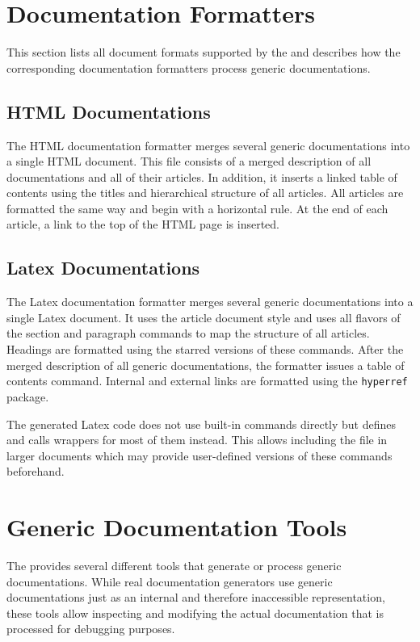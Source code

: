 \section{Documentation Formatters}

This section lists all document formats supported by the \ecs{} and describes how the corresponding documentation formatters process generic documentations.

\subsection{HTML Documentations}

The HTML documentation formatter merges several generic documentations into a single HTML document.
This file consists of a merged description of all documentations and all of their articles.
In addition, it inserts a linked table of contents using the titles and hierarchical structure of all articles.
All articles are formatted the same way and begin with a horizontal rule.
At the end of each article, a link to the top of the HTML page is inserted.

\subsection{Latex Documentations}

The Latex documentation formatter merges several generic documentations into a single Latex document.
It uses the article document style and uses all flavors of the section and paragraph commands to map the structure of all articles.
Headings are formatted using the starred versions of these commands.
After the merged description of all generic documentations, the formatter issues a table of contents command.
Internal and external links are formatted using the \texttt{hyperref} package.

The generated Latex code does not use built-in commands directly but defines and calls wrappers for most of them instead.
This allows including the file in larger documents which may provide user-defined versions of these commands beforehand.

\section{Generic Documentation Tools}

The \ecs{} provides several different tools that generate or process generic documentations.
While real documentation generators use generic documentations just as an internal and therefore inaccessible representation,
these tools allow inspecting and modifying the actual documentation that is processed for debugging purposes.
\interface\renewcommand{\debuggingtool}{}

